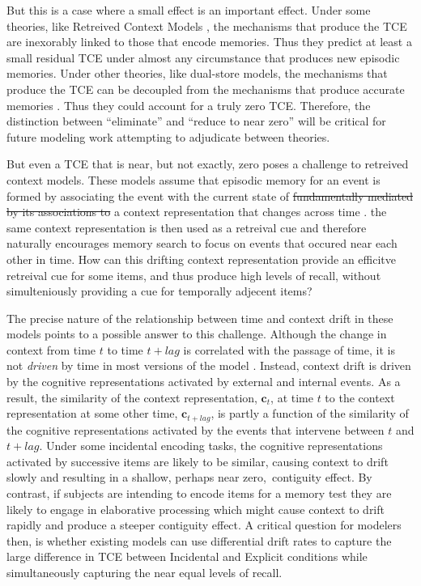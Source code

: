 \documentclass[man,natbib,floatsintext]{apa6} %
\begin{document}
But this is a case where a small effect is an important effect. Under some theories, like Retreived Context Models \citep[e.g.,][]{LohnEtal14,HealKaha15}, the mechanisms that produce the TCE are inexorably linked to those that encode memories. Thus they predict at least a small residual TCE under almost any circumstance that produces new episodic memories. Under other theories, like dual-store models, the mechanisms that produce the TCE can be decoupled from the mechanisms that produce accurate memories \cite[e.g.,][]{LehmMalm13}. Thus they could account for a truly zero TCE. Therefore, the distinction between ``eliminate'' and ``reduce to near zero'' will be critical for future modeling work attempting to adjudicate between theories. 

But even a TCE that is near, but not exactly, zero poses a challenge to retreived context models. These models assume that episodic memory for an event is \color{red} formed by associating the event with the current state of \color{black} \st{fundamentally mediated by its associations to} a context representation that changes across time \citep[e.g.,][]{LohnEtal14,HealKaha15}. \color{red} the same context representation is then used as a retreival cue and therefore naturally encourages memory search to focus on events that occured near each other in time. How can this drifting context representation provide an efficitve retreival cue for some items, and thus produce high levels of recall, without simulteniously providing a cue for temporally adjecent items?

\color{black}
The precise nature of the relationship between time and context drift in these models points to a possible answer to this challenge. Although the change in context from time $t$ to time $t+lag$ is correlated with the passage of time, it is not \emph{driven} by time in most versions of the model \citep[but see][for a model in which drift is driven by time]{HowaEtal14a}. Instead, context drift is driven by the cognitive representations activated by external and internal events. As a result, the similarity of the context representation, $\mathbf{c}_t$, at time $t$ to the context representation at some other time, $\mathbf{c}_{t+lag}$, is partly a function of the similarity of the cognitive representations activated by the events that intervene between $t$ and $t+lag$. Under some incidental encoding tasks, the cognitive representations activated by successive items are likely to be similar, causing context to drift slowly and resulting in a shallow\color{red}, perhaps near zero,\color{black}~contiguity effect. By contrast, if subjects are intending to encode items for a memory test they are likely to engage in elaborative processing which might cause context to drift rapidly and produce a steeper contiguity effect. A critical question for modelers then, is whether existing models can use differential drift rates to capture the large difference in TCE between Incidental and Explicit conditions while simultaneously capturing the near equal levels of recall.
\end{document}
